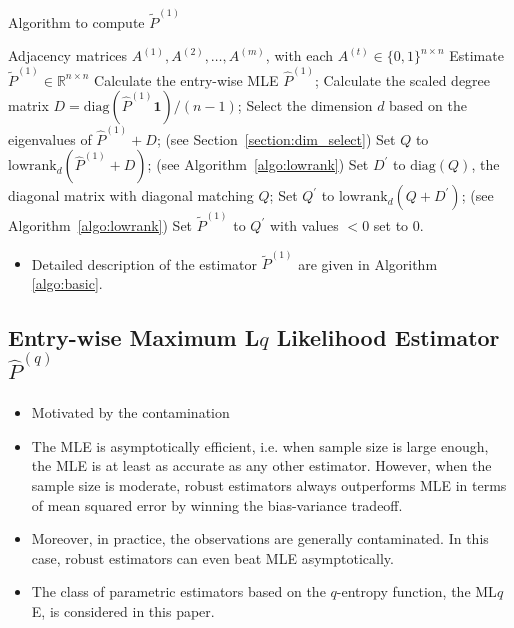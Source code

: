 \documentclass[a4paper]{article}
\renewcommand{\hat}{\widehat}
\begin{document}
\begin{algorithm}[H]
\caption{Algorithm to compute $\widetilde{P}^{(1)}$}
\label{algo:basic}
\begin{algorithmic}[1]
\REQUIRE Adjacency matrices $A^{(1)}, A^{(2)}, \dotsc, A^{(m)}$, with each $A^{(t)} \in \{0,1\}^{n \times n}$
\ENSURE Estimate $\widetilde{P}^{(1)} \in \mathbb{R}^{n \times n}$
\STATE Calculate the entry-wise MLE $\hat{P}^{(1)}$;
\STATE Calculate the scaled degree matrix $D = \mathrm{diag}(\hat{P}^{(1)} \bm{1})/(n-1)$;
\STATE Select the dimension $d$ based on the eigenvalues of $\hat{P}^{(1)} + D$; (see Section~\ref{section:dim_select})
\STATE Set $Q$ to $\mathrm{lowrank}_d(\hat{P}^{(1)} + D)$; (see Algorithm~\ref{algo:lowrank})
\STATE Set $D^{\prime}$ to $ \mathrm{diag}(Q)$, the diagonal matrix with diagonal matching $Q$; 
\STATE Set $Q^{\prime}$ to $\mathrm{lowrank}_d(Q + D^{\prime})$; (see Algorithm~\ref{algo:lowrank})
\STATE Set $\widetilde{P}^{(1)}$ to $Q^{\prime}$ with values $<0$ set to $0$.
\end{algorithmic}
\end{algorithm}

\begin{itemize}
\item Detailed description of the estimator $\widetilde{P}^{(1)}$ are given in Algorithm \ref{algo:basic}.
\end{itemize}

\subsection{Entry-wise Maximum L$q$ Likelihood Estimator $\hat{P}^{(q)}$}
\begin{itemize}
\item Motivated by the contamination
\item The MLE is asymptotically efficient, i.e. when sample size is large enough, the MLE is at least as accurate as any other estimator. However, when the sample size is moderate, robust estimators always outperforms MLE in terms of mean squared error by winning the bias-variance tradeoff.
\item Moreover, in practice, the observations are generally contaminated. In this case, robust estimators can even beat MLE asymptotically.
\item The class of parametric estimators based on the $q$-entropy function, the ML$q$E, is considered in this paper.
\end{itemize}
\end{document}
